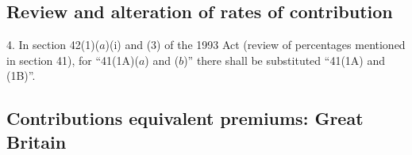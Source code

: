 \documentclass[12pt,a4paper]{article}
\begin{document}
%
%
%
%
%
%
%
%
%
%
%
%
%
%
%


\subsection*{Review and alteration of rates of contribution}

4. In section 42(1)($a$)(i)  and (3)  of the 1993 Act (review of percentages mentioned in section 41), for “41(1A)($a$)  and ($b$)” there shall be substituted “41(1A) and (1B)”.

\subsection*{Contributions equivalent premiums: Great Britain}
\end{document}

